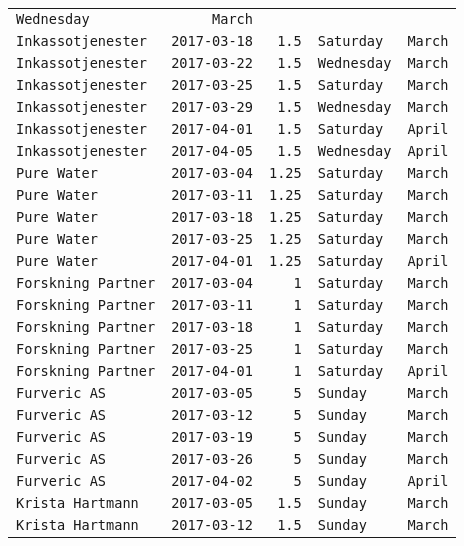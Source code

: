 \documentclass[11pt,A4paper,]{article}
\begin{document}
\begin{longtable}[]{@{}lrrll@{}}
\texttt{Wednesday} & \texttt{March}\tabularnewline
\texttt{Inkassotjenester} & \texttt{2017-03-18} & \texttt{1.5} &
\texttt{Saturday} & \texttt{March}\tabularnewline
\texttt{Inkassotjenester} & \texttt{2017-03-22} & \texttt{1.5} &
\texttt{Wednesday} & \texttt{March}\tabularnewline
\texttt{Inkassotjenester} & \texttt{2017-03-25} & \texttt{1.5} &
\texttt{Saturday} & \texttt{March}\tabularnewline
\texttt{Inkassotjenester} & \texttt{2017-03-29} & \texttt{1.5} &
\texttt{Wednesday} & \texttt{March}\tabularnewline
\texttt{Inkassotjenester} & \texttt{2017-04-01} & \texttt{1.5} &
\texttt{Saturday} & \texttt{April}\tabularnewline
\texttt{Inkassotjenester} & \texttt{2017-04-05} & \texttt{1.5} &
\texttt{Wednesday} & \texttt{April}\tabularnewline
\texttt{Pure\ Water} & \texttt{2017-03-04} & \texttt{1.25} &
\texttt{Saturday} & \texttt{March}\tabularnewline
\texttt{Pure\ Water} & \texttt{2017-03-11} & \texttt{1.25} &
\texttt{Saturday} & \texttt{March}\tabularnewline
\texttt{Pure\ Water} & \texttt{2017-03-18} & \texttt{1.25} &
\texttt{Saturday} & \texttt{March}\tabularnewline
\texttt{Pure\ Water} & \texttt{2017-03-25} & \texttt{1.25} &
\texttt{Saturday} & \texttt{March}\tabularnewline
\texttt{Pure\ Water} & \texttt{2017-04-01} & \texttt{1.25} &
\texttt{Saturday} & \texttt{April}\tabularnewline
\texttt{Forskning\ Partner} & \texttt{2017-03-04} & \texttt{1} &
\texttt{Saturday} & \texttt{March}\tabularnewline
\texttt{Forskning\ Partner} & \texttt{2017-03-11} & \texttt{1} &
\texttt{Saturday} & \texttt{March}\tabularnewline
\texttt{Forskning\ Partner} & \texttt{2017-03-18} & \texttt{1} &
\texttt{Saturday} & \texttt{March}\tabularnewline
\texttt{Forskning\ Partner} & \texttt{2017-03-25} & \texttt{1} &
\texttt{Saturday} & \texttt{March}\tabularnewline
\texttt{Forskning\ Partner} & \texttt{2017-04-01} & \texttt{1} &
\texttt{Saturday} & \texttt{April}\tabularnewline
\texttt{Furveric\ AS} & \texttt{2017-03-05} & \texttt{5} &
\texttt{Sunday} & \texttt{March}\tabularnewline
\texttt{Furveric\ AS} & \texttt{2017-03-12} & \texttt{5} &
\texttt{Sunday} & \texttt{March}\tabularnewline
\texttt{Furveric\ AS} & \texttt{2017-03-19} & \texttt{5} &
\texttt{Sunday} & \texttt{March}\tabularnewline
\texttt{Furveric\ AS} & \texttt{2017-03-26} & \texttt{5} &
\texttt{Sunday} & \texttt{March}\tabularnewline
\texttt{Furveric\ AS} & \texttt{2017-04-02} & \texttt{5} &
\texttt{Sunday} & \texttt{April}\tabularnewline
\texttt{Krista\ Hartmann} & \texttt{2017-03-05} & \texttt{1.5} &
\texttt{Sunday} & \texttt{March}\tabularnewline
\texttt{Krista\ Hartmann} & \texttt{2017-03-12} & \texttt{1.5} &
\texttt{Sunday} & \texttt{March}\tabularnewline

\end{longtable}
\end{document}
